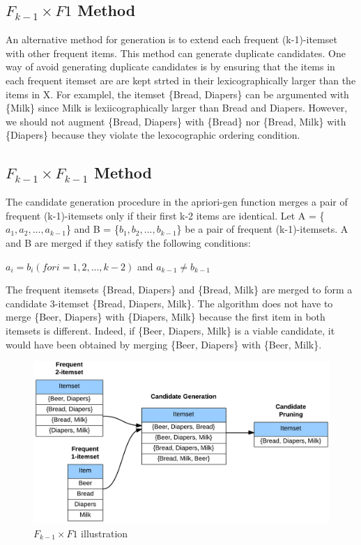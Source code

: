 			\subsection{$F_{k-1} \times F{1}$ Method}
				An alternative method for generation is to extend each frequent (k-1)-itemset with 
				other frequent items. This method can generate duplicate candidates. One way of
				avoid generating duplicate candidates is by ensuring that the items in each frequent 
				itemset are are kept strted in their lexicographically larger than the items in X. 
				For examplel, the itemset \{Bread, Diapers\} can be argumented with \{Milk\}
				since Milk is lexiicographically larger than Bread and Diapers. However, we
				should not augment \{Bread, Diapers\} with \{Bread\} nor \{Bread, Milk\} with 
				\{Diapers\} because they violate the lexocographic ordering condition. 
 
			\subsection{$F_{k-1} \times F_{k-1}$ Method}
				The candidate generation procedure in the apriori-gen function merges a pair of 
				frequent (k-1)-itemsets only if their first k-2 items are identical. 
				Let A = \{$a_{1}, a_{2},...,a_{k-1}$\} and B = \{$b_{1}, b_{2},...,b_{k-1}$\}
				be a pair of frequent (k-1)-itemsets. A and B are merged if they satisfy the following
				conditions:

				$a_{i} = b_{i} (for i =1, 2,..., k-2)$ and $a_{k-1} \neq b_{k-1}$

				The frequent itemsets \{Bread, Diapers\} and \{Bread, Milk\} are merged to form a 
				candidate 3-itemset \{Bread, Diapers, Milk\}. The algorithm does not have to merge
				\{Beer, Diapers\} with \{Diapers, Milk\} because the first item in both itemsets is
				different. Indeed, if \{Beer, Diapers, Milk\} is a viable candidate, it would have been
				obtained by merging \{Beer, Diapers\} with \{Beer, Milk\}.
				
				\begin{figure}[H]
					\centering
					\includegraphics[width=\textwidth]{pics/apriori2.png}
					\caption{$F_{k-1} \times F{1}$ illustration}
				\end{figure}

